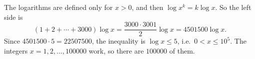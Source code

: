 The logarithms are defined only for $x>0$, and then $\log x^k=k\log x$. So the left side is
\[
(1+2+\cdots+3000)\log x=\dfrac{3000\cdot3001}{2}\log x=4501500\log x .
\]
Since $4501500\cdot5=22507500$, the inequality is $\log x\le5$, i.e.\ $0<x\le10^5$. The integers $x=1,2,\dots,100000$ work, so there are $\boxed{100000}$ of them.
